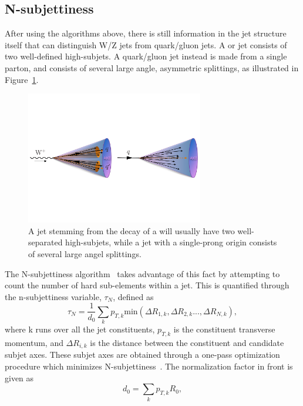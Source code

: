 \subsection{N-subjettiness}
\label{sec:objreco:nsubj}
After using the algorithms above, there is still information in the jet structure itself that can distinguish W/Z jets from quark/gluon jets. A \PW or \PZ jet consists of two well-defined high-\PT subjets. A quark/gluon jet instead is made from a single parton, and consists of several large angle, asymmetric splittings, as illustrated in Figure~\ref{fig:objreco:onevstwoprong}.
\begin{figure}[h!] 
    \centering 
    \includegraphics[width=0.690\textwidth]{figures/event_reconstruction/tau21_sketch.pdf}
     \caption{A jet stemming from the decay of a \PW will usually have two well-separated high-\pt subjets, while a jet with a single-prong origin consists of several large angel splittings.}
     \label{fig:objreco:onevstwoprong}
 \end{figure}
The N-subjettiness algorithm~\cite{Thaler:2010tr} takes advantage of this fact by attempting to count the number of hard sub-elements within a jet. This is quantified through the n-subjettiness variable, $\tau_N$, defined as
 \begin{equation}
 \tau_N = \frac{1}{d_0} \sum_k p_{T,k}\textrm{min}( \Delta R_{1,k},\Delta R_{2,k}...,\Delta R_{N,k}),
 \end{equation} 
where k runs over all the jet constituents, $p_{T,k}$ is the constituent transverse momentum, and $\Delta R_{i,k}$ is the distance between the constituent and candidate subjet axes. These subjet axes are obtained through a one-pass optimization procedure which minimizes N-subjettiness~\cite{Thaler2012}. The normalization factor in front is given as
 \begin{equation}
d_0 = \sum_k p_{T,k} R_0,
 \end{equation} 
